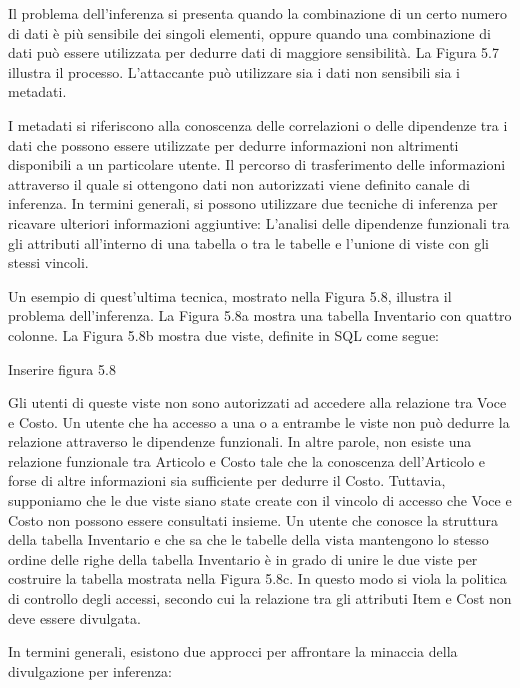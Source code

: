 \singlespacing

Il problema dell'inferenza si presenta quando la combinazione di un certo numero di dati è più sensibile dei singoli elementi, oppure quando una combinazione di dati può essere utilizzata per dedurre dati di maggiore sensibilità. La Figura 5.7 illustra il processo. L'attaccante può utilizzare sia i dati non sensibili sia i metadati. 

\singlespacing

I metadati si riferiscono alla conoscenza delle correlazioni o delle dipendenze tra i dati che possono essere utilizzate per dedurre informazioni non altrimenti disponibili a un particolare utente. Il percorso di trasferimento delle informazioni attraverso il quale si ottengono dati non autorizzati viene definito canale di inferenza.
In termini generali, si possono utilizzare due tecniche di inferenza per ricavare ulteriori informazioni aggiuntive: L'analisi delle dipendenze funzionali tra gli attributi all'interno di una tabella o tra le tabelle e l'unione di viste con gli stessi vincoli.

\singlespacing

Un esempio di quest'ultima tecnica, mostrato nella Figura 5.8, illustra il problema dell'inferenza. La Figura 5.8a mostra una tabella Inventario con quattro colonne. La Figura 5.8b mostra due viste, definite in SQL come segue:

Inserire figura 5.8

Gli utenti di queste viste non sono autorizzati ad accedere alla relazione tra Voce e Costo.
Un utente che ha accesso a una o a entrambe le viste non può dedurre la relazione attraverso le dipendenze funzionali. In altre parole, non esiste una relazione funzionale tra Articolo e Costo tale che la conoscenza dell'Articolo e forse di altre informazioni sia sufficiente per dedurre il Costo. Tuttavia, supponiamo che le due viste siano state create con il vincolo di accesso che Voce e Costo non possono essere consultati insieme. Un utente che conosce la struttura della tabella Inventario e che sa che le tabelle della vista mantengono lo stesso ordine delle righe della tabella Inventario è in grado di unire le due viste per costruire la tabella mostrata nella Figura 5.8c. In questo modo si viola la politica di controllo degli accessi, secondo cui la relazione tra gli attributi Item e Cost non deve essere divulgata.

\singlespacing

In termini generali, esistono due approcci per affrontare la minaccia della divulgazione per inferenza:

